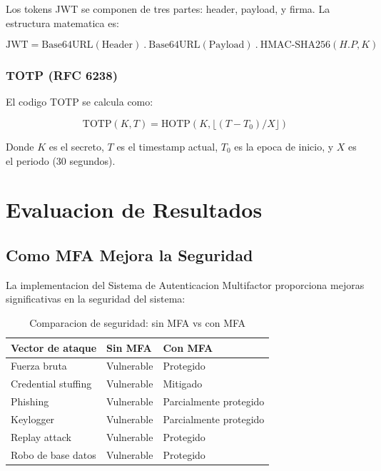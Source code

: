 \documentclass[12pt,a4paper]{article}
\begin{document}
Los tokens JWT se componen de tres partes: header, payload, y firma. La estructura matematica es:

\begin{equation}
\text{JWT} = \text{Base64URL}(\text{Header}) \ . \ \text{Base64URL}(\text{Payload}) \ . \ \text{HMAC-SHA256}(H.P, K)
\end{equation}

\subsubsection{TOTP (RFC 6238)}

El codigo TOTP se calcula como:

\begin{equation}
\text{TOTP}(K, T) = \text{HOTP}(K, \lfloor (T - T_0) / X \rfloor)
\end{equation}

Donde $K$ es el secreto, $T$ es el timestamp actual, $T_0$ es la epoca de inicio, y $X$ es el periodo (30 segundos).

\section{Evaluacion de Resultados}

\subsection{Como MFA Mejora la Seguridad}

La implementacion del Sistema de Autenticacion Multifactor proporciona mejoras significativas en la seguridad del sistema:

\begin{table}[H]
\centering
\caption{Comparacion de seguridad: sin MFA vs con MFA}
\begin{tabular}{@{}p{3cm}p{4.5cm}p{4.5cm}@{}}
\toprule
\textbf{Vector de ataque} & \textbf{Sin MFA} & \textbf{Con MFA} \\
\midrule
Fuerza bruta & Vulnerable & Protegido \\
Credential stuffing & Vulnerable & Mitigado \\
Phishing & Vulnerable & Parcialmente protegido \\
Keylogger & Vulnerable & Parcialmente protegido \\
Replay attack & Vulnerable & Protegido \\
Robo de base datos & Vulnerable & Protegido \\
\bottomrule
\end{tabular}
\end{table}
\end{document}
